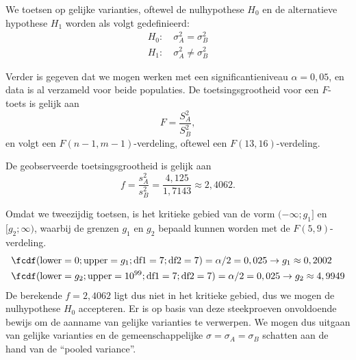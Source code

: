 \begin{enumerate}[label=(\alph*)]
{            We toetsen op gelijke varianties, oftewel de nulhypothese $H_0$ en de alternatieve hypothese $H_1$ worden als volgt gedefinieerd:
            \begin{align*}
                H_0: \quad \sigma_A^2 = \sigma_B^2 \\
                H_1: \quad \sigma_A^2 \neq \sigma_B^2
            \end{align*}

            Verder is gegeven dat we mogen werken met een significantieniveau $\alpha=0,05$, en data is al verzameld voor beide populaties.
            De toetsingsgrootheid voor een $F$-toets is gelijk aan
            \[
                F = \frac{S_A^2}{S_B^2}, 
            \]
            en volgt een $F(n-1, m-1)$-verdeling, oftewel een $F(13, 16)$-verdeling.

            De geobserveerde toetsingsgrootheid is gelijk aan
            \[
                f = \frac{s_A^2}{s_B^2} = \frac{4,125}{1,7143} \approx 2,4062.
            \]
            
            Omdat we tweezijdig toetsen, is het kritieke gebied van de vorm $(-\infty; g_1]$ en $[g_2; \infty)$, waarbij de grenzen $g_1$ en $g_2$ bepaald kunnen worden met de $F(5,9)$-verdeling.
            \begin{align*}
                &\fcdf(\text{lower}=0; \text{upper}=g_1; \text{df1}=7; \text{df2}=7)=\alpha/2=0,025 \rightarrow g_1 \approx 0,2002\\
                &\fcdf(\text{lower}=g_2; \text{upper}=10^{99}; \text{df1}=7; \text{df2}=7)=\alpha/2=0,025 \rightarrow g_2 \approx 4,9949
            \end{align*}
            De berekende $f = 2,4062$ ligt dus niet in het kritieke gebied, dus we mogen de nulhypothese $H_0$ accepteren.
            Er is op basis van deze steekproeven onvoldoende bewijs om de aanname van gelijke varianties te verwerpen.
            We mogen dus uitgaan van gelijke varianties en de gemeenschappelijke $\sigma = \sigma_A = \sigma_B$ schatten aan de hand van de ``pooled variance''.

            \begin{center}
            \end{center}
        }


\end{enumerate}
